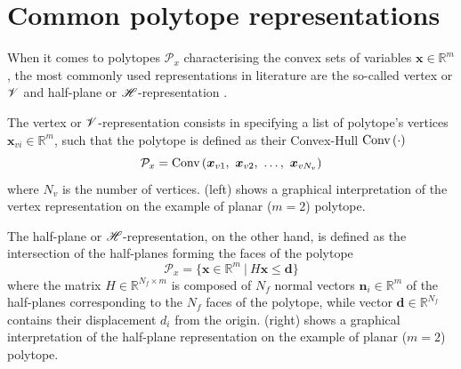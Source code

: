 
\section{Common polytope representations}
\label{ch:representations_practical_apps}


When it comes to polytopes $\mathcal{P}_x$ characterising the convex sets of variables $\bm{x}\in\mathbb{R}^m$, the most commonly used representations in literature are the so-called vertex or $\mathscr{V}$ and half-plane or $\mathscr{H}$-representation \cite{henk2017basic, fukuda2004frequently}. 

The vertex or $\mathscr{V}$-representation consists in specifying a list of polytope's vertices $\bm{x}_{vi}\in\mathbb{R}^m$, such that the polytope is defined as their Convex-Hull $\text{Conv}\left(\cdot\right)$
\begin{equation}
\mathcal{P}_x = \text{Conv}\left(\bm{x}_{v1},~\bm{x}_{v2},~ \ldots , ~\bm{x}_{vN_v} \right)
\end{equation} 
where $N_v$ is the number of vertices.  (left)  shows a graphical interpretation of the vertex representation on the example of planar ($m\!=\!2$) polytope. 


The half-plane or $\mathscr{H}$-representation, on the other hand, is defined as the intersection of the half-planes forming the faces of the polytope
\begin{equation}
  \mathcal{P}_x = \{\bm{x} \in \mathbb{R}^m~ |~ H\bm{x} \leq \bm{d} \}
\end{equation} 
where the matrix $H \in \mathbb{R}^{N_f\times m }$ is composed of $N_f$ normal vectors $\bm{n}_i\in\mathbb
{R}^m$ of the half-planes corresponding to the $N_f$ faces of the polytope, while vector $\bm{d}\in \mathbb{R}^{N_f}$ contains their displacement $d_i$ from the origin.  (right) shows a graphical interpretation of the half-plane representation on the example of planar ($m\!=\!2$) polytope. 

